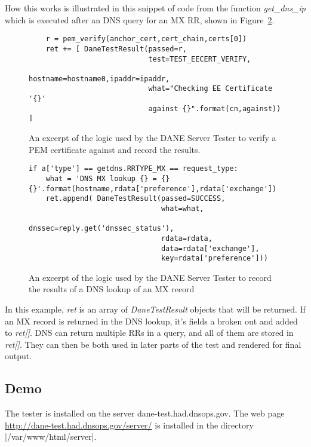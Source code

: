 \documentclass[preprint,3p,11pt]{elsarticle}
\begin{document}
How this works is illustrated in this snippet of code from the
function \emph{get\_dns\_ip} which is executed after an DNS query for
an MX RR, shown in Figure~\ref{snippet}. 

\begin{figure}
\begin{lstlisting}
    r = pem_verify(anchor_cert,cert_chain,certs[0])
    ret += [ DaneTestResult(passed=r,
                            test=TEST_EECERT_VERIFY,
                            hostname=hostname0,ipaddr=ipaddr,
                            what="Checking EE Certificate '{}'
                            against {}".format(cn,against)) ]

\end{lstlisting}
\caption{An excerpt of the logic used by the DANE Server Tester to
  verify a PEM certificate against and record the results.}\label{pem-snippet}
\end{figure}


\begin{figure}
\begin{lstlisting}
if a['type'] == getdns.RRTYPE_MX == request_type:
    what = 'DNS MX lookup {} = {} {}'.format(hostname,rdata['preference'],rdata['exchange'])
    ret.append( DaneTestResult(passed=SUCCESS,
                               what=what,
                               dnssec=reply.get('dnssec_status'),
                               rdata=rdata,
                               data=rdata['exchange'],
                               key=rdata['preference']))
\end{lstlisting}
\caption{An excerpt of the logic used by the DANE Server Tester to
  record the results of a DNS lookup of an MX record }\label{snippet}
\end{figure}

In this example, \emph{ret} is an array of \emph{DaneTestResult}
objects that will be returned. If an MX record is returned in the DNS
lookup, it's fields a broken out and added to \emph{ret[]}. DNS can
return multiple RRs in a query, and all of them are stored in
\emph{ret[]}.  They can then be both used in later parts of the test
and rendered for final output.

\subsection{Demo}
The tester is installed on the server dane-test.had.dnsops.gov. The
web page \url{http://dane-test.had.dnsops.gov/server/} is installed in the
directory |/var/www/html/server|.
\end{document}
